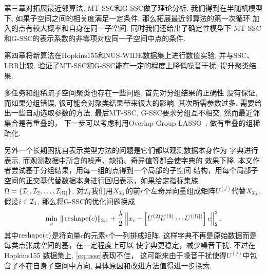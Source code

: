 第三章对拓展最近邻算法, MT-SSC和G-SSC做了理论分析. 我们得到在半随机模型下,
如果子空间之间的相关度满足一定条件, 那么拓展最近邻算法的第一次循环
加入的点有较大概率和自身在同一子空间. 同时我们还给出了确定性模型下
MT-SSC和G-SSC的表示系数的非零项对应同一子空间中点的条件.

第四章将新算法在Hopkins155和NUS-WIDE数据集上进行数值实验,
并与SSC、LRR比较. 验证了MT-SSC和G-SSC能在一定的程度上降低噪音干扰,
提升聚类结果.

多任务和组稀疏子空间聚类也存在一些问题, 首先对分组结果的正确性
没有保证, 而如果分组错误, 很可能会对聚类结果带来很大的影响.
其次所需参数过多, 需要给出一些自动选取参数的方法.
最后MT-SSC, G-SSC要求分组互不相交, 然而最近邻集合是有重叠的，
下一步可以考虑利用Overlap Group LASSO~\cite{jacob2009group},
做有重叠的组稀疏化.

另外一个长期困扰自表示类型方法的问题是它们都以观测数据本身作为
字典进行表示, 而观测数据中所含的噪声、缺损、奇异值等都会使字典的
效果下降. 本文作者尝试基于分组结果，用每一组的点得到一个局部的子空间
结构，用每个局部子空间的正交基代替数据本身进行回归表示，如果给定指标集族
\(\Omega=\{\mathcal{I}_1, \mathcal{I}_2, \ldots, \mathcal{I}_{|\Omega|}\}\),
对\(\mathcal{I}_j\)我们用\(X_{\mathcal{I}_j}\)的前\(r\)个左奇异向量组成矩阵\(U^{(j)}\)代替\(X_{\mathcal{I}_j}\).
假设\(i \in \mathcal{I}_1\), 那么将G-SSC的优化问题换成
\begin{equation}
  \min_{c} \, \|\operatorname{reshape}(c)\|_{2, 1}+\frac{\lambda}{2}
  \left\|x_i-\left[ U^{(2)} U^{(3)} \cdots U^{(|\Omega|)}\right]c\right\|_2^2.
  \label{eq:ussc}
\end{equation}
其中\(\operatorname{reshape}(c)\)是将向量\(c\)的元素\(r\)个一列排成矩阵.
这样字典不再是原始数据而是每类点张成空间的基，在一定程度上可以
使字典更稳定，减少噪音干扰. 不过在Hopkins155 数据集上, \eqref{eq:ussc}表现不佳，
这可能来由于噪音干扰使得\(U^{(j)}\)中包含了不在自身子空间中方向,
具体原因和改进方法值得进一步探索.
